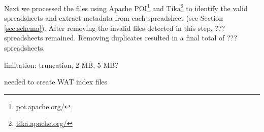 \documentclass[conference]{IEEEtran}
\begin{document}
Next we processed the files using Apache POI\footnote{\url{poi.apache.org/}} and Tika\footnote{\url{tika.apache.org/}} to identify the valid spreadsheets and extract metadata from each spreadsheet (see Section \ref{sec:schema}). After removing the invalid files detected in this step, ??? spreadsheets remained. Removing duplicates resulted in a final total of ??? spreadsheets. 





limitation: truncation, 2 MB, 5 MB?

needed to create WAT index files

\end{document}
